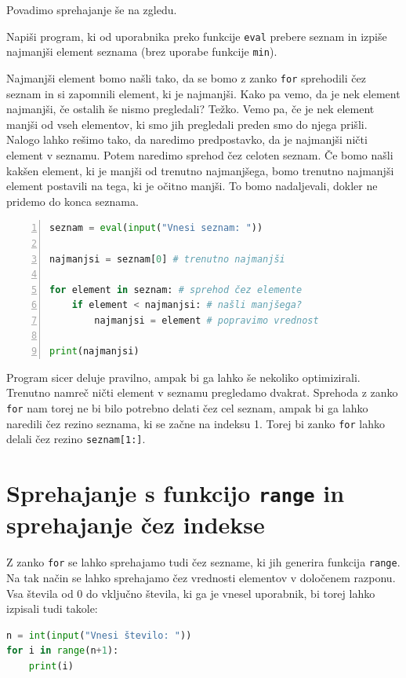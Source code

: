 Povadimo sprehajanje še na zgledu.
\begin{zgled}
Napiši program, ki od uporabnika preko funkcije \texttt{eval} prebere seznam in izpiše najmanjši element seznama (brez uporabe funkcije \texttt{min}). 
\end{zgled}
\begin{resitev}
Najmanjši element bomo našli tako, da se bomo z zanko \texttt{for} sprehodili čez seznam in si zapomnili element, ki je najmanjši. Kako pa vemo, da je nek element najmanjši, če ostalih še nismo pregledali? Težko. Vemo pa, če je nek element manjši od vseh elementov, ki smo jih pregledali preden smo do njega prišli. Nalogo lahko rešimo tako, da naredimo predpostavko, da je najmanjši ničti element v seznamu. Potem naredimo sprehod čez celoten seznam. Če bomo našli kakšen element, ki je manjši od trenutno najmanjšega, bomo trenutno najmanjši element postavili na tega, ki je očitno manjši. To bomo nadaljevali, dokler ne pridemo do konca seznama.
\begin{lstlisting}[language=Python,numbers=left]
seznam = eval(input("Vnesi seznam: "))

najmanjsi = seznam[0] # trenutno najmanjši

for element in seznam: # sprehod čez elemente
    if element < najmanjsi: # našli manjšega?
        najmanjsi = element # popravimo vrednost

print(najmanjsi)
\end{lstlisting}
Program sicer deluje pravilno, ampak bi ga lahko še nekoliko optimizirali. Trenutno namreč ničti element v seznamu pregledamo dvakrat. Sprehoda z zanko \texttt{for} nam torej ne bi bilo potrebno delati čez cel seznam, ampak bi ga lahko naredili čez rezino seznama, ki se začne na indeksu 1. Torej bi zanko \texttt{for} lahko delali čez rezino \texttt{seznam[1:]}.
\end{resitev}

\section{Sprehajanje s funkcijo \texttt{range} in sprehajanje čez indekse}

Z zanko \texttt{for} se lahko sprehajamo tudi čez sezname, ki jih generira funkcija \texttt{range}. Na tak način se lahko sprehajamo čez vrednosti elementov v določenem razponu. Vsa števila od 0 do vključno števila, ki ga je vnesel uporabnik, bi torej lahko izpisali tudi takole:
\begin{lstlisting}[language=Python]
n = int(input("Vnesi število: "))
for i in range(n+1):
    print(i)
\end{lstlisting}

